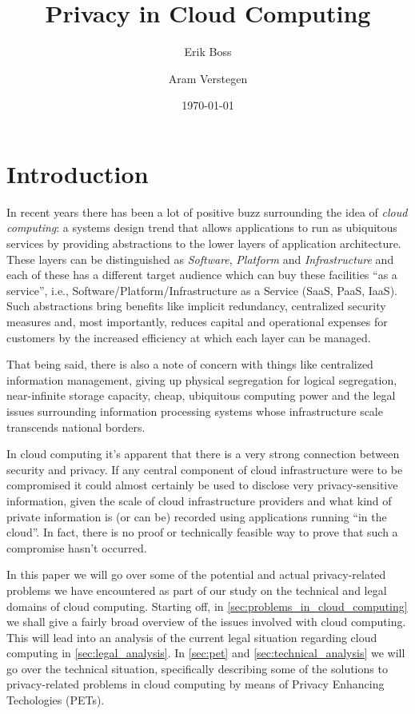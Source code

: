 \documentclass[11pt]{article}
\begin{document}
\title{Privacy in Cloud Computing}

\author{Erik Boss \and Aram Verstegen}
\date{\today}
\maketitle


\section{Introduction}
In recent years there has been a lot of positive buzz surrounding the idea of \textit{cloud computing}: a systems design trend that allows applications to run as ubiquitous services by providing abstractions to the lower layers of application architecture.
These layers can be distinguished as \textit{Software}, \textit{Platform} and \textit{Infrastructure} and each of these has a different target audience which can buy these facilities ``as a service'', i.e., Software/Platform/Infrastructure as a Service (SaaS, PaaS, IaaS). 
Such abstractions bring benefits like implicit redundancy, centralized security measures and, most importantly, reduces capital and operational expenses for customers by the increased efficiency at which each layer can be managed.

That being said, there is also a note of concern with things like centralized information management, giving up physical segregation for logical segregation, near-infinite storage capacity, cheap, ubiquitous computing power and the legal issues surrounding information processing systems whose infrastructure scale transcends national borders.

In cloud computing it's apparent that there is a very strong connection between security and privacy.
If any central component of cloud infrastructure were to be compromised it could almost certainly be used to disclose very privacy-sensitive information, given the scale of cloud infrastructure providers and what kind of private information is (or can be) recorded using applications running ``in the cloud''. In fact, there is no proof or technically feasible way to prove that such a compromise hasn't occurred.

In this paper we will go over some of the potential and actual privacy-related problems we have encountered as part of our study on the technical and legal domains of cloud computing. Starting off, in \autoref{sec:problems_in_cloud_computing} we shall give a fairly broad overview of the issues involved with cloud computing.
This will lead into an analysis of the current legal situation regarding cloud computing in \autoref{sec:legal_analysis}. In \autoref{sec:pet} and \autoref{sec:technical_analysis} we will go over the technical situation, specifically describing some of the solutions to privacy-related problems in cloud computing by means of Privacy Enhancing Techologies (PETs).
\end{document}
